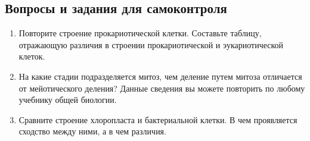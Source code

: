 \subsection*{Вопросы и задания для самоконтроля}

\begin{enumerate}
	\item{Повторите строение \hypertarget{q_prok_cell}{прокариотической клетки}. Составьте таблицу, отражающую различия в строении прокариотической и эукариотической клеток.}
	\item На какие стадии подразделяется \hypertarget{q_mitos}{митоз}, чем деление путем митоза отличается от мейотического деления? Данные сведения вы можете повторить по любому учебнику общей биологии.
	\item Сравните строение \hypertarget{question_hloroplast}{хлоропласта} и бактериальной клетки. В чем проявляется сходство между ними, а в чем различия.
\end{enumerate}


